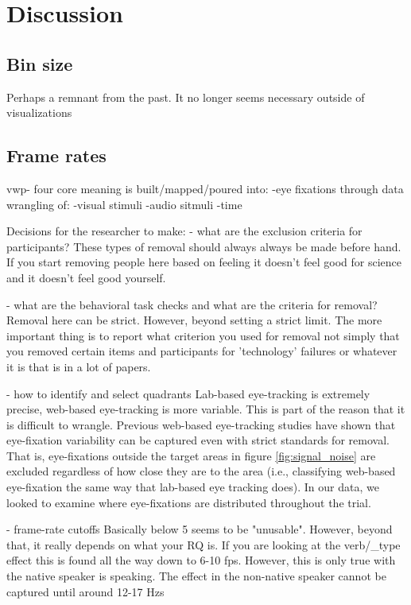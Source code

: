 \section{Discussion}

 

\subsection{Bin size}
Perhaps a remnant from the past. It no longer seems necessary outside of visualizations

\subsection{Frame rates}




vwp- four core
meaning is built/mapped/poured into:
-eye fixations
through data wrangling of:
-visual stimuli
-audio sitmuli
-time

Decisions for the researcher to make:
- what are the exclusion criteria for participants?
These types of removal should always always be made before hand. If you start removing people here based on feeling it doesn't feel good for science and it doesn't feel good yourself. 


- what are the behavioral task checks and what are the criteria for removal?
Removal here can be strict. However, beyond setting a strict limit. The more important thing is to report what criterion you used for removal not simply that you removed certain items and participants for 'technology' failures or whatever it is that is in a lot of papers.


- how to identify and select quadrants
Lab-based eye-tracking is extremely precise, web-based eye-tracking is more variable. This is part of the reason that it is difficult to wrangle. Previous web-based eye-tracking studies have shown that eye-fixation variability can be captured even with strict standards for removal. That is, eye-fixations outside the target areas in figure \ref{fig:signal_noise} are excluded regardless of how close they are to the area (i.e., classifying web-based eye-fixation the same way that lab-based eye tracking does). In our data, we looked to examine where eye-fixations are distributed throughout the trial.

- frame-rate cutoffs
Basically below 5 seems to be "unusable". However, beyond that, it really depends on what your RQ is. If you are looking at the verb/_type effect this is found all the way down to 6-10 fps. However, this is only true with the native speaker is speaking. The effect in the non-native speaker cannot be captured until around 12-17 Hzs


